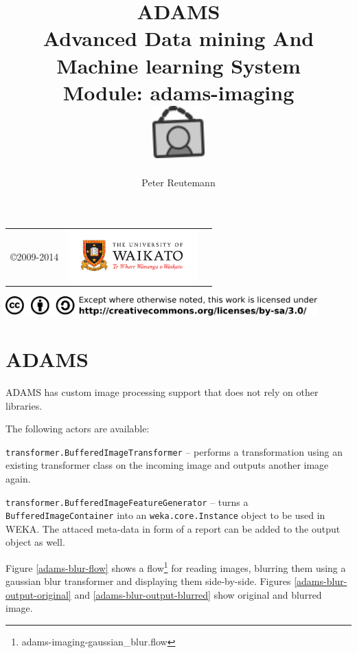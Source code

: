 \documentclass[a4paper]{book}
\title{
  \textbf{ADAMS} \\
  {\Large \textbf{A}dvanced \textbf{D}ata mining \textbf{A}nd \textbf{M}achine
  learning \textbf{S}ystem} \\
  {\Large Module: adams-imaging} \\
  \vspace{1cm}
  \includegraphics[width=2cm]{images/imaging-module.png} \\
}
\author{
  Peter Reutemann
}
\begin{document}
\begin{titlepage}
\maketitle

\thispagestyle{empty}
\center
\begin{table}[b]
	\begin{tabular}{c l l}
		\parbox[c][2cm]{2cm}{\copyright 2009-2014} &
		\parbox[c][2cm]{5cm}{\includegraphics[width=5cm]{images/coat_of_arms.pdf}} \\
	\end{tabular}
	\includegraphics[width=12cm]{images/cc.png} \\
\end{table}

\end{titlepage}

\tableofcontents
\listoffigures


\chapter{ADAMS}
ADAMS has custom image processing support that does not rely on other libraries.

The following actors are available:
\begin{tight_itemize}
	\item \texttt{transformer.BufferedImageTransformer} -- performs a transformation
	using an existing transformer class on the incoming image and
	outputs another image again.
	\item \texttt{transformer.BufferedImageFeatureGenerator} -- turns a
	\texttt{BufferedImageContainer} into an \texttt{weka.core.Instance} object to
	be used in WEKA. The attaced meta-data in form of a report can be added to the
	output object as well.
\end{tight_itemize}

Figure \ref{adams-blur-flow} shows a
flow\footnote{adams-imaging-gaussian\_blur.flow} for reading images, blurring
them using a gaussian blur transformer and displaying them side-by-side. Figures
\ref{adams-blur-output-original} and \ref{adams-blur-output-blurred} show original
and blurred image.
\end{document}
